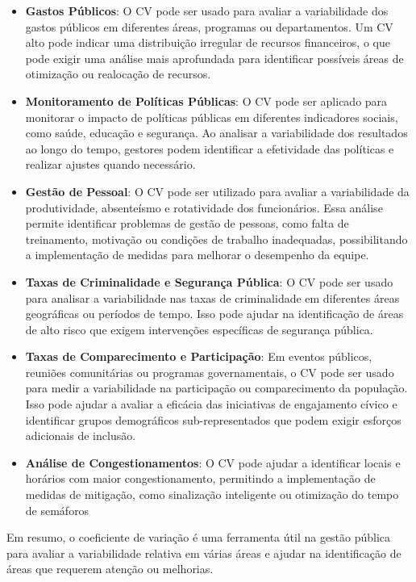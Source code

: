 \begin{itemize}
    \item \textbf{Gastos Públicos}: O CV pode ser usado para avaliar a variabilidade dos gastos públicos em diferentes áreas, programas ou departamentos. Um CV alto pode indicar uma distribuição irregular de recursos financeiros, o que pode exigir uma análise mais aprofundada para identificar possíveis áreas de otimização ou realocação de recursos.

    \item \textbf{Monitoramento de Políticas Públicas}: O CV pode ser aplicado para monitorar o impacto de políticas públicas em diferentes indicadores sociais, como saúde, educação e segurança. Ao analisar a variabilidade dos resultados ao longo do tempo, gestores podem identificar a efetividade das políticas e realizar ajustes quando necessário.
    \item \textbf{Gestão de Pessoal}: O CV pode ser utilizado para avaliar a variabilidade da produtividade, absenteísmo e rotatividade dos funcionários. Essa análise permite identificar problemas de gestão de pessoas, como falta de treinamento, motivação ou condições de trabalho inadequadas, possibilitando a implementação de medidas para melhorar o desempenho da equipe.
    \item \textbf{Taxas de Criminalidade e Segurança Pública}: O CV pode ser usado para analisar a variabilidade nas taxas de criminalidade em diferentes áreas geográficas ou períodos de tempo. Isso pode ajudar na identificação de áreas de alto risco que exigem intervenções específicas de segurança pública.
    \item \textbf{Taxas de Comparecimento e Participação}: Em eventos públicos, reuniões comunitárias ou programas governamentais, o CV pode ser usado para medir a variabilidade na participação ou comparecimento da população. Isso pode ajudar a avaliar a eficácia das iniciativas de engajamento cívico e identificar grupos demográficos sub-representados que podem exigir esforços adicionais de inclusão.
    \item \textbf{Análise de Congestionamentos}: O CV pode ajudar a identificar locais e horários com maior congestionamento, permitindo a implementação de medidas de mitigação, como sinalização inteligente ou otimização do tempo de semáforos 
\end{itemize}

Em resumo, o coeficiente de variação é uma ferramenta útil na gestão pública para avaliar a variabilidade relativa em várias áreas e ajudar na identificação de áreas que requerem atenção ou melhorias.

